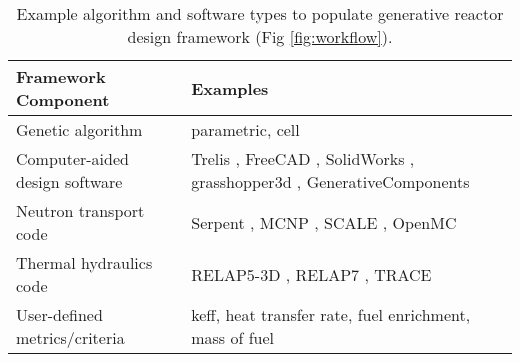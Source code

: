 \documentclass[letterpaper,11pt]{article}
\begin{document}
\begin{table}[h]
        \caption{Example algorithm and software types to populate generative reactor 
        design framework (Fig \ref{fig:workflow}).}
        \label{tab:examples}
        \centering
        \doublespacing
        \small
        \begin{tabular}{lp{10cm}}
        \hline
        \textbf{Framework Component} & \textbf{Examples}\\ \hline
        Genetic algorithm & parametric, cell \cite{renner_genetic_2003} \\
        Computer-aided design software & Trelis \cite{noauthor_trelis_2018}, FreeCAD \cite{falck_freecad_2012}, SolidWorks \cite{lombard_solidworks_2008}, grasshopper3d \cite{rutten_grasshopper3d_2015}, GenerativeComponents \cite{aish_bentleys_2003} \\
        Neutron transport code & Serpent \cite{leppanen_serpent_2014}, MCNP \cite{werner_mcnp6._2018}, SCALE \cite{bucholz_scale:_1982}, OpenMC \cite{romano_openmc_2013} \\ 
        Thermal hydraulics code & RELAP5-3D \cite{strydom_comparison_2016}, RELAP7 \cite{andrs_relap-7_2012}, TRACE \cite{xu_multi-physics_2006}\\
        User-defined metrics/criteria & keff, heat transfer rate, fuel enrichment, mass of fuel \\ \hline
\end{tabular}
\end{table}




\end{document}
